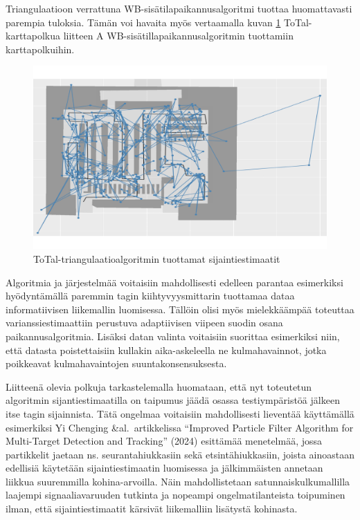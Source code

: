 \documentclass[
  12pt,
  a4paper, twoside]{book}
\begin{document}
Triangulaatioon verrattuna WB-sisätilapaikannusalgoritmi tuottaa huomattavasti parempia tuloksia. Tämän voi havaita myös vertaamalla kuvan \ref{fig:total-karttapolku} ToTal-karttapolkua liitteen A WB-sisätillapaikannusalgoritmin tuottamiin karttapolkuihin.

\begin{figure}[H]
\centering
\includegraphics[width=15cm]{total-karttapolku}
\caption{ToTal-triangulaatioalgoritmin tuottamat sijaintiestimaatit}
\label{fig:total-karttapolku}
\end{figure}

Algoritmia ja järjestelmää voitaisiin mahdollisesti edelleen parantaa esimerkiksi hyödyntämällä paremmin tagin kiihtyvyysmittarin tuottamaa dataa informatiivisen liikemallin luomisessa. Tällöin olisi myös mielekkäämpää toteuttaa varianssiestimaattiin perustuva adaptiivisen viipeen suodin osana paikannusalgoritmia. Lisäksi datan valinta voitaisiin suorittaa esimerkiksi niin, että datasta poistettaisiin kullakin aika-askeleella ne kulmahavainnot, jotka poikkeavat kulmahavaintojen suuntakonsensuksesta.

Liitteenä olevia polkuja tarkastelemalla huomataan, että nyt toteutetun algoritmin sijantiestimaatilla on taipumus jäädä osassa testiympäristöä jälkeen itse tagin sijainnista. Tätä ongelmaa voitaisiin mahdollisesti lieventää käyttämällä esimerkiksi Yi Chenging \&al.~artikkelissa ``Improved Particle Filter Algorithm for Multi-Target Detection and Tracking'' (2024) \citep{Cheng-2024} esittämää menetelmää, jossa partikkelit jaetaan ns. seurantahiukkasiin sekä etsintähiukkasiin, joista ainoastaan edellisiä käytetään sijaintiestimaatin luomisessa ja jälkimmäisten annetaan liikkua suuremmilla kohina-arvoilla. Näin mahdollistetaan satunnaiskulkumallilla laajempi signaaliavaruuden tutkinta ja nopeampi ongelmatilanteista toipuminen ilman, että sijaintiestimaatit kärsivät liikemalliin lisätystä kohinasta.
\end{document}
